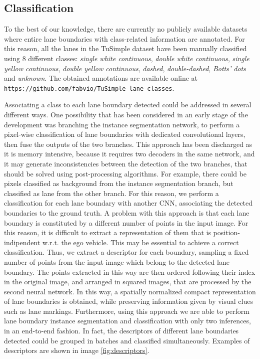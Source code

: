 \documentclass[runningheads]{llncs}
\begin{document}
\subsection{Classification}
To the best of our knowledge, there are currently no publicly available datasets where entire lane boundaries with class-related information are annotated. For this reason, all the lanes in the TuSimple dataset have been manually classified using 8 different classes: \textit{single white continuous}, \textit{double white continuous}, \textit{single yellow continuous}, \textit{double yellow continuous}, \textit{dashed}, \textit{double-dashed}, \textit{Botts' dots} and \textit{unknown}. The obtained annotations are available online at \texttt{https://github.com/fabvio/TuSimple-lane-classes}.

Associating a class to each lane boundary detected could be addressed in several different ways. One possibility that has been considered in an early stage of the development was branching the instance segmentation network, to perform a pixel-wise classification of lane boundaries with dedicated convolutional layers, then fuse the outputs of the two branches. This approach has been discharged as it is memory intensive, because it requires two decoders in the same network, and it may generate inconsistencies between the detection of the two branches, that should be solved using post-processing algorithms. For example, there could be pixels classified as background from the instance segmentation branch, but classified as lane from the other branch. For this reason, we perform a classification for each lane boundary with another CNN, associating the detected boundaries to the ground truth. A problem with this approach is that each lane boundary is constituted by a different number of points in the input image. For this reason, it is difficult to extract a representation of them that is position-indipendent w.r.t. the ego vehicle. This may be essential to achieve a correct classification. Thus, we extract a descriptor for each boundary, sampling a fixed number of points from the input image which belong to the detected lane boundary. The points extracted in this way are then ordered following their index in the original image, and arranged in squared images, that are processed by the second neural network. In this way, a spatially normalized compact representation of lane boundaries is obtained, while preserving information given by visual clues such as lane markings. Furthermore, using this approach we are able to perform lane boundary instance segmentation and classification with only two inferences, in an end-to-end fashion. In fact, the descriptors of different lane boundaries detected could be grouped in batches and classified simultaneously. Examples of descriptors are shown in image \ref{fig:descriptors}.
\end{document}

